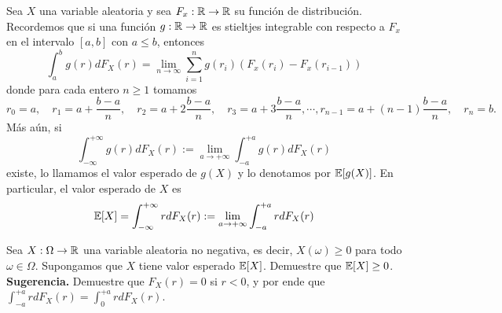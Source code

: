 \documentclass[12pt,a4paper]{article}
\begin{document}
    Sea $X$ una variable aleatoria y sea $F_{x}:\mathbb{R}\to\mathbb{R}$ su función de distribución. Recordemos que si una función $g:\mathbb{R}\to\mathbb{R}$ es
    stieltjes integrable con respecto a $F_{x}$ en el intervalo $[a,b]$ con $a\leq b$, entonces
    \begin{equation*}
        \int_{a}^{b}g(r)dF_{X}(r)=\lim_{n\to\infty}\sum_{i=1}^{n}g(r_{i})(F_{x}(r_{i})-F_{x}(r_{i-1}))
    \end{equation*}
    donde para cada entero $n\geq1$ tomamos
    \begin{equation*}
        r_{0}=a,\quad r_{1}=a+\frac{b-a}{n},\quad r_{2}=a+2\frac{b-a}{n},\quad r_{3}=a+3\frac{b-a}{n},\cdots,r_{n-1}=a+(n-1)\frac{b-a}{n},\quad r_{n}=b.
    \end{equation*}
    Más aún, si
    \begin{equation*}
        \int_{-\infty}^{+\infty}g(r)dF_{X}(r):=\lim_{a\to+\infty}\int_{-a}^{+a}g(r)dF_{X}(r)
    \end{equation*}
    existe, lo llamamos el valor esperado de $g(X)$ y lo denotamos por $\mathbb{E}[g(X)]$. En particular, el valor esperado de $X$ es
    \begin{equation*}
        \mathbb{E}[X]=\int_{-\infty}^{+\infty}rdF_{X}(r):=\lim_{a\to+\infty}\int_{-a}^{+a}rdF_{X}(r)
    \end{equation*}

    \begin{mdframed}[style=mdpinkbox,frametitle={Ejercicio 7}]
        Sea $X:\Omega\to\mathbb{R}$ una variable aleatoria no negativa, es decir, $X(\omega)\geq0$ para todo $\omega\in\Omega$.
        Supongamos que $X$ tiene valor esperado $\mathbb{E}[X]$. Demuestre que $\mathbb{E}[X]\geq0$. \textbf{Sugerencia.} Demuestre que
        $F_{X}(r)=0$ si $r\lt0$, y por ende que $\int_{-a}^{+a}rdF_{X}(r)=\int_{0}^{+a}rdF_{X}(r)$.
    \end{mdframed}
\end{document}

